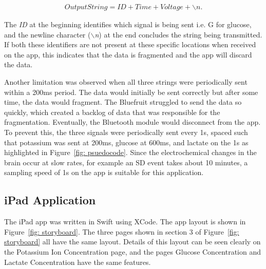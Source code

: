 \begin{align}
    OutputString = ID + Time + Voltage + \backslash n.
    \nonumber
\end{align}

The \textit{ID} at the beginning identifies which signal is being sent i.e. G for glucose, and the newline character (\textit{$\backslash$n}) at the end concludes the string being transmitted. If both these identifiers are not present at these specific locations when received on the app, this indicates that the data is fragmented and the app will discard the data. 

Another limitation was observed when all three strings were periodically sent within a 200ms period. The data would initially be sent correctly but after some time, the data would fragment. The Bluefruit struggled to send the data so quickly, which created a backlog of data that was responsible for the fragmentation. Eventually, the Bluetooth module would disconnect from the app. To prevent this, the three signals were periodically sent every 1s, spaced such that potassium was sent at 200ms, glucose at 600ms, and lactate on the 1s as highlighted in Figure~\ref{fig: psuedocode}. Since the electrochemical changes in the brain occur at slow rates, for example an SD event takes about 10 minutes, a sampling speed of 1s on the app is suitable for this application. 





\subsection{iPad Application}
The iPad app was written in Swift using XCode. The app layout is shown in Figure~\ref{fig: storyboard}. The three pages shown in section 3 of Figure~\ref{fig: storyboard} all have the same layout. Details of this layout can be seen clearly on the Potassium Ion Concentration page, and the pages Glucose Concentration and Lactate Concentration have the same features. 

